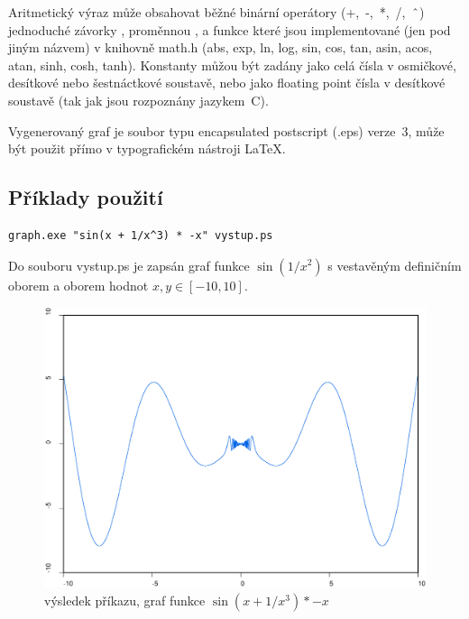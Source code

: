 \documentclass[11pt]{article}
\newcommand\CARET{\mathbin{\char`\^}}
\begin{document}
Aritmetický výraz může obsahovat běžné binární operátory (+,~-,~*,~/,~$\CARET$)
jednoduché závorky \uv{()}, proměnnou , a funkce které jsou
implementované (jen pod jiným názvem) v knihovně math.h (abs, exp, ln, log,
sin, cos, tan, asin, acos, atan, sinh, cosh, tanh). Konstanty můžou být zadány
jako celá čísla v osmičkové, desítkové nebo šestnáctkové soustavě, nebo jako
floating point čísla v desítkové soustavě (tak jak jsou rozpoznány jazykem~C).

Vygenerovaný graf je soubor typu encapsulated postscript (.eps) verze~3, může
být použit přímo v typografickém nástroji \LaTeX.

\subsection{Příklady použití}
\begin{verbatim}
graph.exe "sin(x + 1/x^3) * -x" vystup.ps 
\end{verbatim}
Do souboru vystup.ps je zapsán graf funkce $\sin (1 / x^2)$
s vestavěným definičním oborem a oborem hodnot $x, y \in [-10, 10]$.
\begin{figure}[ht!]
\centering
	\includegraphics[width=13cm]{figures/test1.eps}
	\caption{výsledek příkazu, graf funkce $\sin \left(x + 1/x^3 \right) * -x$}
\end{figure}
\clearpage
\end{document}

